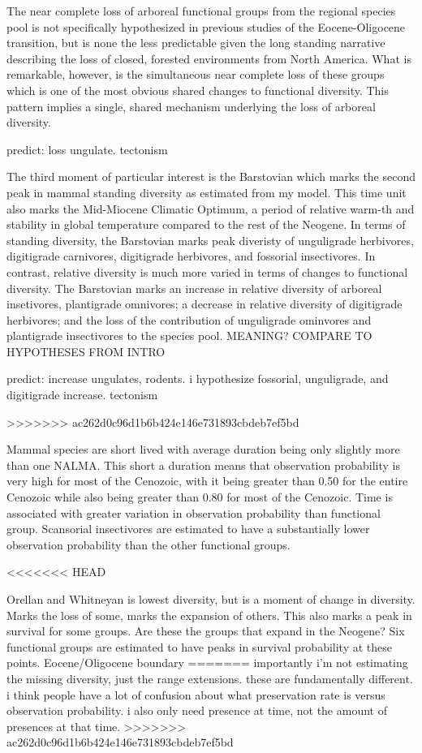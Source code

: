\documentclass[12pt,letterpaper]{article}
\begin{document}
The near complete loss of arboreal functional groups from the regional species pool is not specifically hypothesized in previous studies of the Eocene-Oligocene transition, but is none the less predictable given the long standing narrative describing the loss of closed, forested environments from North America. What is remarkable, however, is the simultaneous near complete loss of these groups which is one of the most obvious shared changes to functional diversity. This pattern implies a single, shared mechanism underlying the loss of arboreal diversity.

predict: loss ungulate. tectonism




The third moment of particular interest is the Barstovian which marks the second peak in mammal standing diversity as estimated from my model. This time unit also marks the Mid-Miocene Climatic Optimum, a period of relative warm-th and stability in global temperature compared to the rest of the Neogene. In terms of standing diversity, the Barstovian marks peak diveristy of unguligrade herbivores, digitigrade carnivores, digitigrade herbivores, and fossorial insectivores. In contrast, relative diversity is much more varied in terms of changes to functional diversity. The Barstovian marks an increase in relative diversity of arboreal insetivores, plantigrade omnivores; a decrease in relative diversity of digitigrade herbivores; and the loss of the contribution of unguligrade ominvores and plantigrade insectivores to the species pool. \uppercase{meaning? compare to hypotheses from intro}

predict: increase ungulates, rodents. i hypothesize fossorial, unguligrade, and digitigrade increase. tectonism

>>>>>>> ac262d0c96d1b6b424e146e731893cbdeb7ef5bd


Mammal species are short lived with average duration being only slightly more than one NALMA. This short a duration means that observation probability is very high for most of the Cenozoic, with it being greater than 0.50 for the entire Cenozoic while also being greater than 0.80 for most of the Cenozoic. Time is associated with greater variation in observation probability than functional group. Scansorial insectivores are estimated to have a substantially lower observation probability than the other functional groups.

<<<<<<< HEAD

Orellan and Whitneyan is lowest diversity, but is a moment of change in diversity. Marks the loss of some, marks the expansion of others. This also marks a peak in survival for some groups. Are these the groups that expand in the Neogene? Six functional groups are estimated to have peaks in survival probability at these points. Eocene/Oligocene boundary
=======
importantly i'm not estimating the missing diversity, just the range extensions. these are fundamentally different. i think people have a lot of confusion about what preservation rate is versus observation probability. i also only need presence at time, not the amount of presences at that time.
>>>>>>> ac262d0c96d1b6b424e146e731893cbdeb7ef5bd
\end{document}
